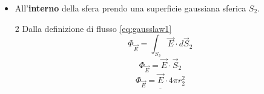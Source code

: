 \documentclass[twoside]{article}
\begin{document}
\begin{itemize}
          \begin{equation*}
              Q = \rho \cdot V_{sfera}
          \end{equation*}
          \begin{equation*}
              Q = \rho \cdot \frac{4}{3} \pi R^3
          \end{equation*}
    \item All'\textbf{interno} della sfera prendo una superficie gaussiana sferica $S_2$.\\
          \begin{multicols}{2}
              \noindent
              Dalla definizione di flusso \ref{eq:gausslaw1}
              \begin{equation*}
                  \Phi_{\vec{E}} = \displaystyle \int_{S_2} \vec{E} \cdot d\vec{S}_2
              \end{equation*}
              \begin{equation*}
                  \Phi_{\vec{E}} = \displaystyle  \vec{E} \cdot \vec{S}_2
              \end{equation*}
              \begin{equation*}
                  \underline{\Phi_{\vec{E}} = \vec{E} \cdot 4\pi r_{2}^2}
              \end{equation*}
              \columnbreak
              \noindent


\end{multicols}
\end{itemize}
\end{document}

